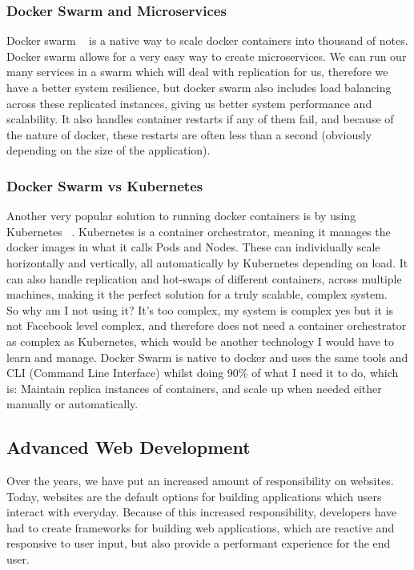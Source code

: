 \documentclass[titlepage]{article}
\begin{document}
\subsubsection{Docker Swarm and Microservices}
Docker swarm ~\cite{docker_swarm} is a native way to scale docker containers into thousand of notes. Docker swarm allows for a very easy way to create microservices. We can run our many services in a swarm which will deal with replication for us, therefore we have a better system resilience, but docker swarm also includes load balancing across these replicated instances, giving us better system performance and scalability. It also handles container restarts if any of them fail, and because of the nature of docker, these restarts are often less than a second (obviously depending on the size of the application).

\subsubsection{Docker Swarm vs Kubernetes}
Another very popular solution to running docker containers is by using Kubernetes ~\cite{kubernetes}. Kubernetes is a container orchestrator, meaning it manages the docker images in what it calls Pods and Nodes. These can individually scale horizontally and vertically, all automatically by Kubernetes depending on load. It can also handle replication and hot-swaps of different containers, across multiple machines, making it the perfect solution for a truly scalable, complex system. \\

So why am I not using it? It's too complex, my system is complex yes but it is not Facebook level complex, and therefore does not need a container orchestrator as complex as Kubernetes, which would be another technology I would have to learn and manage. Docker Swarm is native to docker and uses the same tools and CLI (Command Line Interface) whilst doing 90\% of what I need it to do, which is: Maintain replica instances of containers, and scale up when needed either manually or automatically. \\

\subsection{Advanced Web Development}
Over the years, we have put an increased amount of responsibility on websites. Today, websites are the default options for building applications which users interact with everyday. Because of this increased responsibility, developers have had to create frameworks for building web applications, which are reactive and responsive to user input, but also provide a performant experience for the end user.
\end{document}
